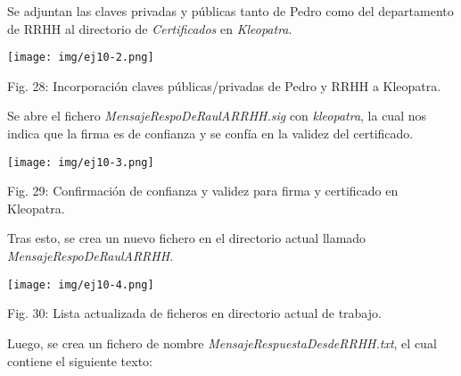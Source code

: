 \documentclass[12pt,oneside,a4paper]{book}
\begin{document}
\vspace{1em}

\hspace{20pt}
Se adjuntan las claves privadas y públicas tanto de Pedro como del departamento de RRHH al directorio de \textit{Certificados} en \textit{Kleopatra}.

\vspace{2em}

\begin{center}
    \texttt{[image: img/ej10-2.png]}
    
\vspace{0.1em}
    
    Fig. 28: Incorporación claves públicas/privadas de Pedro y RRHH a Kleopatra.
\end{center}

\vspace{2em}

\hspace{20pt}
Se abre el fichero \textit{MensajeRespoDeRaulARRHH.sig} con \textit{kleopatra}, la cual nos indica que la firma es de confianza y se confía en la validez del certificado.

\newpage

\begin{center}
    \texttt{[image: img/ej10-3.png]}
    
\vspace{0.1em}
    
    Fig. 29: Confirmación de confianza y validez para firma y certificado en Kleopatra.
\end{center}

\vspace{2em}

\hspace{20pt}
Tras esto, se crea un nuevo fichero en el directorio actual llamado \textit{MensajeRespoDeRaulARRHH}.

\vspace{2em}

\begin{center}
    \texttt{[image: img/ej10-4.png]}
    
\vspace{0.1em}
    
    Fig. 30: Lista actualizada de ficheros en directorio actual de trabajo.
\end{center}

\vspace{2em}

\hspace{20pt}
Luego, se crea un fichero de nombre \textit{MensajeRespuestaDesdeRRHH.txt}, el cual contiene el siguiente texto:
\end{document}
